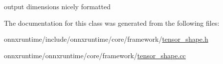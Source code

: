 output dimensions nicely formatted 

The documentation for this class was generated from the following files\+:\begin{DoxyCompactItemize}
\item 
onnxruntime/include/onnxruntime/core/framework/\mbox{\hyperlink{tensor__shape_8h}{tensor\+\_\+shape.\+h}}\item 
onnxruntime/onnxruntime/core/framework/\mbox{\hyperlink{tensor__shape_8cc}{tensor\+\_\+shape.\+cc}}\end{DoxyCompactItemize}
